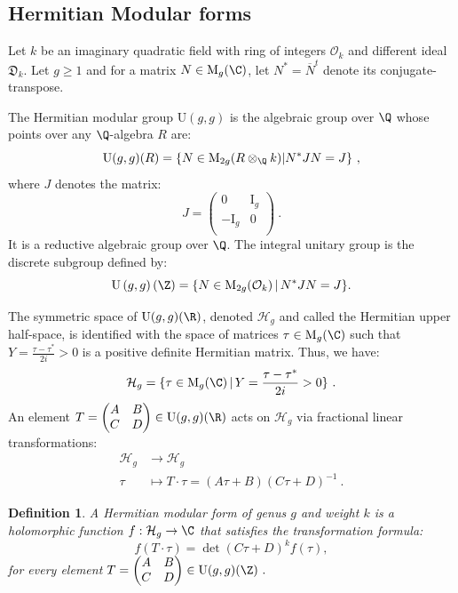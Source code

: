 \documentclass[11pt,letterpaper,english]{amsart}
\numberwithin{equation}{subsection}
\numberwithin{equation}{section}
\newcommand\cH{{\mathcal H}}
\newcommand\cO{{\mathcal O}}
\theoremstyle{plain}
\newtheorem{definition}[theorem]{Definition}
\theoremstyle{remark}
\begin{document}
\subsection{Hermitian Modular forms}
Let $k$ be an imaginary quadratic field with ring of integers $\cO_k$ and different ideal $\mathfrak{D}_k$. Let $g\geq 1$ and for a matrix $N\in \mathrm M _g(\C)$, let $N^{*}=\overline{N}^t$ denote its conjugate-transpose. 
\medskip

The Hermitian modular group $\mathrm U(g,g)$ is the algebraic group over $\Q$ whose points over any $\Q$-algebra $R$ are:
\[\mathrm U(g,g)(R)=\{N\in \mathrm M_{2g}(R\otimes_\Q k)| N^{*}JN=J\}~,\]
where $J$ denotes the matrix:
\[J=\begin{pmatrix}
    0&\mathrm I_g\\-\mathrm I_g&0\\
\end{pmatrix}~.\]
It is a reductive algebraic group over $\Q$. %
The integral unitary group is the discrete subgroup defined by: 
\[\mathrm U\left(g,g\right)(\Z)=\{N\in \mathrm M_{2g}(\cO_k)\,|\, N^* JN=J\}.\]

The symmetric space of $\mathrm U(g,g)(\R)$, denoted $\mathcal{H}_g$ and called the Hermitian upper half-space, is identified with the space of matrices $\tau \in \mathrm{M}_g(\C)$ such that $Y=\frac{\tau-\tau^*}{2i} >0$ is a positive definite Hermitian matrix. Thus, we have:
\[\mathcal{H}_g=\{\tau\in \mathrm{M}_g(\C)\,|\, Y=\frac{\tau-\tau^*}{2i} >0 \}~.\]
An element $T=\begin{pmatrix}A&B\\C&D\\\end{pmatrix}\in\mathrm U(g,g)(\R)$ acts on $\cH_g$ via fractional linear transformations:
\begin{align*}
\cH_g&\rightarrow\cH_g\\
\tau&\mapsto T\cdot \tau= (A\tau +B)(C\tau+D)^{-1}~.
\end{align*}

\begin{definition}
    A Hermitian modular form of genus $g$ and weight $k$ is a holomorphic function $ f:\cH_g\rightarrow \C$ that satisfies the transformation formula: 
    \[ f\left(T\cdot \tau \right)=\det\left(C\tau+D\right)^kf\left(\tau\right),\]
    for every element $T=\begin{pmatrix}
        A&B\\
        C&D\\
    \end{pmatrix}\in \mathrm{U}(g,g)(\Z)~.$
\end{definition}
\end{document}
